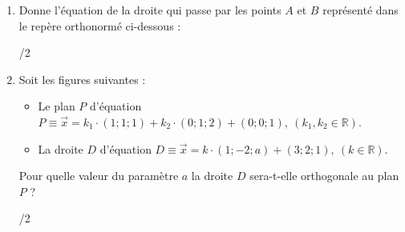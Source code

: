 \begin{enumerate}
		\item 
			\begin{minipage}[t]{.9\textwidth}
				Donne l'équation de la droite qui passe par les points $A$ et $B$ représenté dans le repère orthonormé ci-dessous :
				\begin{center}
				\end{center}
			\end{minipage}%
			\begin{minipage}{.1\textwidth}
				\begin{flushright}
					{\large /2}
				\end{flushright}
			\end{minipage}
			\vspace{3em}
			
		\item 
			\begin{minipage}[t]{.9\textwidth}
				Soit les figures suivantes :
				\begin{itemize}
					\item Le plan $P$ d'équation $P \equiv \vec{x} = k_1 \cdot \left(1; 1; 1\right) + k_2 \cdot\left(0; 1; 2\right) + \left(0; 0; 1\right), ~(k_1, k_2 \in \mathbb{R})$.
					\item La droite $D$ d'équation $D \equiv \vec{x} = k \cdot \left(1; -2; a\right) + \left(3; 2; 1\right), ~(k \in \mathbb{R})$.
				\end{itemize}
			Pour quelle valeur du paramètre $a$ la droite $D$ sera-t-elle orthogonale au plan $P$ ?
			\end{minipage}%
			\begin{minipage}{.1\textwidth}
				\begin{flushright}
					{\large /2}
				\end{flushright}
			\end{minipage}
			

	\end{enumerate}
	
